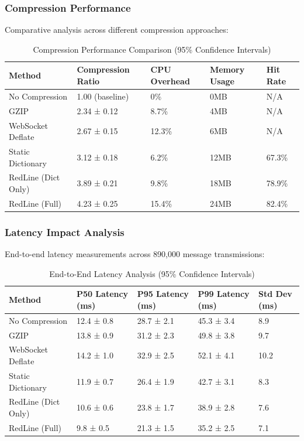 \documentclass[12pt,a4paper]{article}
\begin{document}
\subsubsection{Compression Performance}

Comparative analysis across different compression approaches:

\begin{table}[H]
\centering
\begin{tabular}{|l|l|l|l|l|}
\hline
\textbf{Method} & \textbf{Compression Ratio} & \textbf{CPU Overhead} & \textbf{Memory Usage} & \textbf{Hit Rate} \\
\hline
No Compression & 1.00 (baseline) & 0\% & 0MB & N/A \\
GZIP & 2.34 ± 0.12 & 8.7\% & 4MB & N/A \\
WebSocket Deflate & 2.67 ± 0.15 & 12.3\% & 6MB & N/A \\
Static Dictionary & 3.12 ± 0.18 & 6.2\% & 12MB & 67.3\% \\
RedLine (Dict Only) & 3.89 ± 0.21 & 9.8\% & 18MB & 78.9\% \\
RedLine (Full) & 4.23 ± 0.25 & 15.4\% & 24MB & 82.4\% \\
\hline
\end{tabular}
\caption{Compression Performance Comparison (95\% Confidence Intervals)}
\label{tab:compression-performance}
\end{table}

\subsubsection{Latency Impact Analysis}

End-to-end latency measurements across 890,000 message transmissions:

\begin{table}[H]
\centering
\begin{tabular}{|l|l|l|l|l|}
\hline
\textbf{Method} & \textbf{P50 Latency (ms)} & \textbf{P95 Latency (ms)} & \textbf{P99 Latency (ms)} & \textbf{Std Dev (ms)} \\
\hline
No Compression & 12.4 ± 0.8 & 28.7 ± 2.1 & 45.3 ± 3.4 & 8.9 \\
GZIP & 13.8 ± 0.9 & 31.2 ± 2.3 & 49.8 ± 3.8 & 9.7 \\
WebSocket Deflate & 14.2 ± 1.0 & 32.9 ± 2.5 & 52.1 ± 4.1 & 10.2 \\
Static Dictionary & 11.9 ± 0.7 & 26.4 ± 1.9 & 42.7 ± 3.1 & 8.3 \\
RedLine (Dict Only) & 10.6 ± 0.6 & 23.8 ± 1.7 & 38.9 ± 2.8 & 7.6 \\
RedLine (Full) & 9.8 ± 0.5 & 21.3 ± 1.5 & 35.2 ± 2.5 & 7.1 \\
\hline
\end{tabular}
\caption{End-to-End Latency Analysis (95\% Confidence Intervals)}
\label{tab:latency-analysis}
\end{table}
\end{document}
